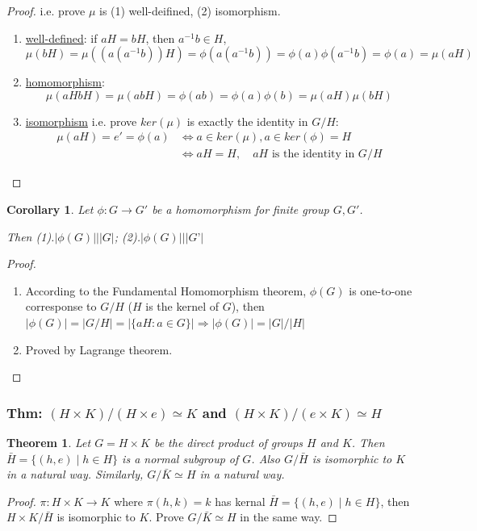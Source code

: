 \documentclass[11pt,a4paper]{article}
\newtheorem{theorem}{Theorem}
\newtheorem{corollary}{Corollary}
\begin{document}
\begin{proof}
i.e. prove $\mu$ is (1) well-deifined, (2) isomorphism.
\begin{enumerate}[(1)]
    \item \underline{well-defined}: if $aH=bH$, then $a^{-1}b\in H$, $$\mu(bH)=\mu((a(a^{-1}b))H)=\phi(a(a^{-1}b))=\phi(a)\phi(a^{-1}b)=\phi(a)=\mu(aH)$$
    \item \underline{homomorphism}:$$\mu(aHbH)=\mu(abH)=\phi(ab)=\phi(a)\phi(b)=\mu(aH)\mu(bH)$$
    \item \underline{isomorphism} i.e. prove $ker(\mu)$ is exactly the identity in $G/H$:
    \begin{equation}
        \begin{aligned}
            \mu(aH)=e'=\phi(a) & \Leftrightarrow a\in ker(\mu),a\in ker(\phi)=H\\
            &\Leftrightarrow aH=H,\quad aH\text{ is the identity in }G/H
        \end{aligned}
        \nonumber
    \end{equation}
\end{enumerate}
\end{proof}

\begin{corollary}
Let $\phi: G \rightarrow G'$ be a homomorphism for finite group $G,G'$.

Then (1).$|\phi(G)|\bigg|  |G|$; (2).$|\phi(G)|\bigg|  |G’|$
\end{corollary}
\begin{proof}
\quad
\begin{enumerate}[(1)]
    \item According to the Fundamental Homomorphism theorem, $\phi(G)$ is one-to-one corresponse to $G/H$ ($H$ is the kernel of $G$), then $|\phi(G)|=|G/H|=|\{aH: a\in G\}| \Rightarrow|\phi(G)|=|G|/|H|$
    \item Proved by Lagrange theorem.
\end{enumerate}
\end{proof}

\subsubsection{Thm: $(H\times K)/(H\times e)\simeq K$ and $(H\times K)/(e\times K)\simeq H$}
\begin{theorem}
    Let $G=H \times K$ be the direct product of groups $H$ and $K$. Then $\bar{H}=\{(h, e) \mid h \in H\}$ is a normal subgroup of $G$. Also $G / \bar{H}$ is isomorphic to $K$ in a natural way. Similarly, $G / \bar{K} \simeq H$ in a natural way.
\end{theorem}
\begin{proof}
    $\pi:H\times K \rightarrow	K$ where $\pi(h,k)=k$ has kernal $\bar{H}=\{(h, e) \mid h \in H\}$, then $H\times K/\bar{H}$ is isomorphic to $K$. Prove $G / \bar{K} \simeq H$ in the same way.
\end{proof}
\end{document}
